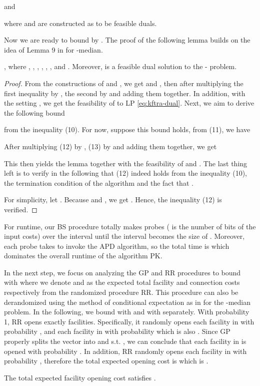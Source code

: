 \documentclass[10pt]{llncs}
\begin{document}
and




where 
and 
are constructed as 
to be feasible duals.

Now we are ready to bound 
by .
The proof of the following lemma builds on the idea of Lemma 9 in
\cite{jain01approximation} for -median.
\begin{lemma}
\textup{,}
where ,\textup{ ,
 ,
},
,
,
 and .
Moreover, 
is a feasible dual solution to the - problem.\label{lem:1bound}\end{lemma}
\begin{proof}
From the constructions of 
and ,
we get 
and ,
then 
after multiplying the first inequality by , the second by 
and adding them together. In addition, with the setting ,
we get the feasibility of 
to LP \eqref{eq:kftra-dual}. Next, we aim to derive the following
bound 

 

from the inequality (10). For now, suppose this bound holds, from
(11), we have


After multiplying (12) by , (13) by  and adding them together,
we get 


This then yields the lemma together with the feasibility of 
and . The
last thing left is to verify in the following that (12) indeed holds
from the inequality (10), the termination condition of the algorithm
 and the
fact that .




For simplicity, let .
Because  and , we get .
Hence, the inequality (12) is verified.
\end{proof}
For runtime, our BS procedure totally makes 
probes ( is the number of bits of the input costs) over the interval
 until the interval becomes
the size of . Moreover, each probe takes
 to invoke the APD algorithm, so the total
time is  which dominates
the overall runtime of the algorithm PK.

In the next step, we focus on analyzing the GP and RR procedures to
bound  with
 where
we denote  and  as the expected total facility and connection
costs respectively from the randomized procedure RR. This procedure
can also be derandomized using the method of conditional expectation
as in \cite{jain01approximation} for the -median problem. In
the following, we bound  with  and  with  separately.
With probability 1, RR opens exactly  facilities. Specifically,
it randomly opens each facility in  with probability
, and each facility in  with probability
 which is also . Since GP properly
splits the vector  into 
and  s.t. ,
we can conclude that each facility in  is opened
with probability . In addition, RR randomly opens each facility
in  with probability , therefore the total
expected opening cost is  which is .
\begin{lemma}
The total expected facility opening cost  satisfies .
\end{lemma}
\end{document}
